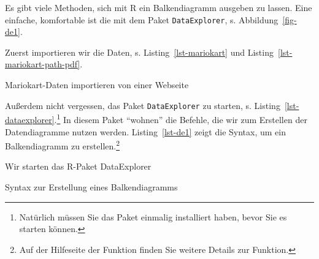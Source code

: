 \documentclass[
  a4paper,
  DIV=11]{scrreprt}
\newenvironment{Shaded}{\begin{snugshade}}{\end{snugshade}}
\newcommand{\FunctionTok}[1]{\textcolor[rgb]{0.28,0.35,0.67}{#1}}
\newcommand{\NormalTok}[1]{\textcolor[rgb]{0.00,0.23,0.31}{#1}}
\newcommand{\OtherTok}[1]{\textcolor[rgb]{0.00,0.23,0.31}{#1}}
\newcommand{\SpecialCharTok}[1]{\textcolor[rgb]{0.37,0.37,0.37}{#1}}
\theoremstyle{definition}
\theoremstyle{definition}
\theoremstyle{definition}
\theoremstyle{remark}
\begin{document}
Es gibt viele Methoden, sich mit R ein Balkendiagramm ausgeben zu
lassen. Eine einfache, komfortable ist die mit dem Paket
\texttt{DataExplorer}, s. Abbildung~\ref{fig-de1}.

Zuerst importieren wir die Daten, s. Listing~\ref{lst-mariokart} und
Listing~\ref{lst-mariokart-path-pdf}.

\begin{codelisting}

\caption{\label{lst-mariokart}Mariokart-Daten importieren von einer
Webseite}

\centering{

\begin{Shaded}
\begin{Highlighting}[]
\NormalTok{mariokart }\OtherTok{\textless{}{-}} \FunctionTok{read.csv}\NormalTok{(mariokart\_path)}
\end{Highlighting}
\end{Shaded}

}

\end{codelisting}%

Außerdem nicht vergessen, das Paket \texttt{DataExplorer} zu starten, s.
Listing~\ref{lst-dataexplorer}.\footnote{Natürlich müssen Sie das Paket
  einmalig installiert haben, bevor Sie es starten können.} In diesem
Paket ``wohnen'' die Befehle, die wir zum Erstellen der Datendiagramme
nutzen werden. Listing~\ref{lst-de1} zeigt die Syntax, um ein
Balkendiagramm zu erstellen.\footnote{Auf der Hilfeseite der Funktion
  finden Sie weitere Details zur Funktion.}

\begin{codelisting}

\caption{\label{lst-dataexplorer}Wir starten das R-Paket DataExplorer}

\centering{

\begin{Shaded}
\begin{Highlighting}[]
\FunctionTok{library}\NormalTok{(DataExplorer)}
\end{Highlighting}
\end{Shaded}

}

\end{codelisting}%

\begin{codelisting}

\caption{\label{lst-de1}Syntax zur Erstellung eines Balkendiagramms}

\centering{

\begin{Shaded}
\begin{Highlighting}[]
\NormalTok{mariokart }\SpecialCharTok{\%\textgreater{}\%} 
  \FunctionTok{select}\NormalTok{(cond) }\SpecialCharTok{\%\textgreater{}\%} 
  \FunctionTok{plot\_bar}\NormalTok{()}
\end{Highlighting}
\end{Shaded}

}

\end{codelisting}%
\end{document}
